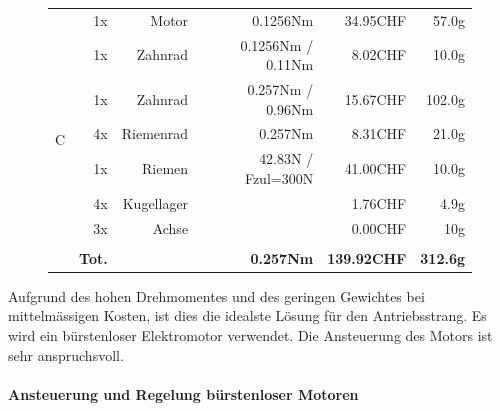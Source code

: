 \begin{figure}[h!]
\begin{tabular}{rrrrrr}
    \multirow{9}[2]{*}{C} & 1x    & Motor & 0.1256Nm & 34.95CHF & 57.0g \\
          & 1x    & Zahnrad & 0.1256Nm  / 0.11Nm & 8.02CHF & 10.0g \\
          & 1x    & Zahnrad & 0.257Nm / 0.96Nm & 15.67CHF & 102.0g \\
          & 4x    & Riemenrad & 0.257Nm & 8.31CHF & 21.0g \\
          & 1x    & Riemen & 42.83N / Fzul=300N & 41.00CHF & 10.0g \\
          & 4x    & Kugellager &       & 1.76CHF & 4.9g \\
          & 3x    & Achse &       & 0.00CHF & 10g \\
          &       &       &       &       &  \\
          & \textbf{Tot.} &       & \textbf{0.257Nm} & \textbf{139.92CHF} & \textbf{312.6g} \\

    \end{tabular}%
  \label{tab:addlabel}%

\end{figure}

Aufgrund des hohen Drehmomentes und des geringen Gewichtes bei mittelmässigen Kosten, ist dies die idealste Lösung für den Antriebsstrang. Es wird ein bürstenloser Elektromotor verwendet. Die Ansteuerung des Motors ist sehr anspruchsvoll.

\paragraph{Ansteuerung und Regelung bürstenloser Motoren}
